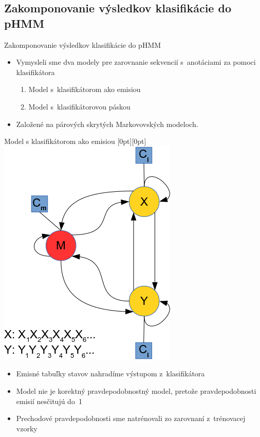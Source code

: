 \documentclass[xcolor=dvipsnames, compress, 12pt]{beamer}
\newcommand{\lenitem}[2][.6\linewidth]{\parbox[t]{#1}{\strut #2\strut}}
\theoremstyle{definition}
\begin{document}
\subsection{Zakomponovanie výsledkov klasifikácie do pHMM}
\begin{frame}{Zakomponovanie výsledkov klasifikácie do pHMM}

\begin{itemize}
  \item Vymysleli sme dva modely pre zarovnanie sekvencií s~anotáciami za pomoci klasifikátora
  \begin{enumerate}
    \item Model s~klasifikátorom ako emisiou
    \item Model s~klasifikátorovou páskou
  \end{enumerate}
  \item Založené na párových skrytých Markovovských modeloch.
\end{itemize}

\end{frame}

\begin{frame}{Model s klasifikátorom ako emisiou}
  \mbox{}\hfill\raisebox{-\height}[0pt][0pt]{
   \includegraphics[width=.30\textwidth]{images/zakladny_model}
   }
  \vspace*{-\baselineskip}

  \begin{itemize}
    \item \lenitem{Emisné tabuľky stavov nahradíme výstupom z~klasifikátora}
    \item \lenitem{Model nie je korektný pravdepodobnostný model, pretože pravdepodobnosti emisií nesčitujú do~1}
    \item \lenitem{Prechodové pravdepodobnosti sme natrénovali zo zarovnaní z~trénovacej vzorky}
  \end{itemize}
\end{frame}

\end{document}
